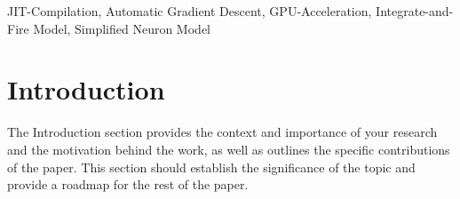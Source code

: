 \documentclass[conference]{IEEEtran}
\begin{document}
\begin{abstract}
\begin{enumerate}
\end{enumerate}
\vspace{0.5em}
\emph{B. Best Practices for Writing the Abstract}
\begin{itemize}
\item Conciseness:
\begin{itemize}
    \item Limit the abstract to 150–250 words per standard computer science publication guidelines.
    \item Focus on essential information, avoiding excessive detail or technical jargon.
\end{itemize}
\item Quantitative Results:
\begin{itemize}
   \item Whenever possible, include numerical values to make your results more impactful and concrete. Example: The method reduces computational overhead by 15\% and increases scalability by supporting workloads of up to 10,000 tasks.
\end{itemize}
\end{itemize}
\end{abstract}

\begin{IEEEkeywords}
JIT-Compilation, Automatic Gradient Descent, GPU-Acceleration, Integrate-and-Fire Model, Simplified Neuron Model
\end{IEEEkeywords}

\section{Introduction}\label{sec:intro}
The Introduction section provides the context and importance of your research and the motivation behind the work, as well as outlines the specific contributions of the paper. This section should establish the significance of the topic and provide a roadmap for the rest of the paper.  
\end{document}
